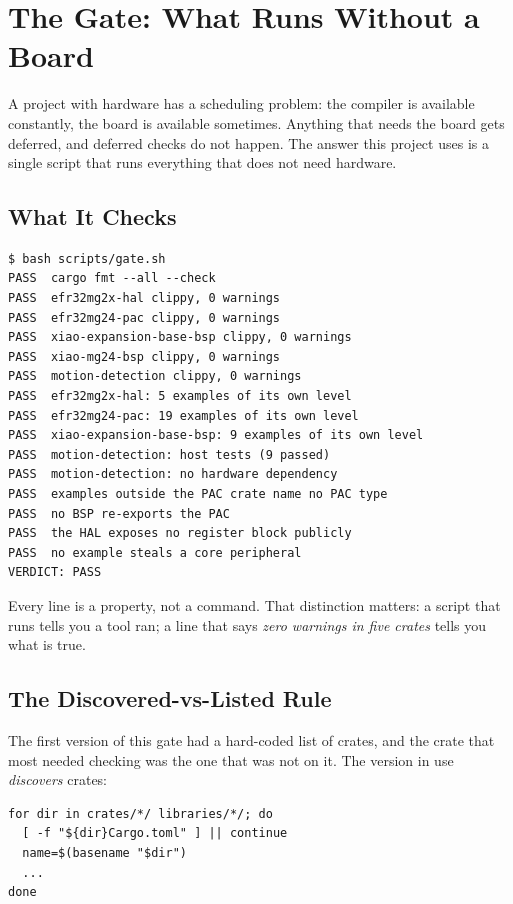 \section{The Gate: What Runs Without a Board}
\label{sec:build-gate}

A project with hardware has a scheduling problem: the compiler is available constantly, the board is
available sometimes. Anything that needs the board gets deferred, and deferred checks do not happen.
The answer this project uses is a single script that runs everything that does not need hardware.

\subsection{What It Checks}

\begin{verbatim}
$ bash scripts/gate.sh
PASS  cargo fmt --all --check
PASS  efr32mg2x-hal clippy, 0 warnings
PASS  efr32mg24-pac clippy, 0 warnings
PASS  xiao-expansion-base-bsp clippy, 0 warnings
PASS  xiao-mg24-bsp clippy, 0 warnings
PASS  motion-detection clippy, 0 warnings
PASS  efr32mg2x-hal: 5 examples of its own level
PASS  efr32mg24-pac: 19 examples of its own level
PASS  xiao-expansion-base-bsp: 9 examples of its own level
PASS  motion-detection: host tests (9 passed)
PASS  motion-detection: no hardware dependency
PASS  examples outside the PAC crate name no PAC type
PASS  no BSP re-exports the PAC
PASS  the HAL exposes no register block publicly
PASS  no example steals a core peripheral
VERDICT: PASS
\end{verbatim}

Every line is a property, not a command. That distinction matters: a script that runs
 tells you a tool ran; a line that says \emph{zero warnings in five crates}
tells you what is true.

\subsection{The Discovered-vs-Listed Rule}

The first version of this gate had a hard-coded list of crates, and the crate that most needed
checking was the one that was not on it. The version in use \emph{discovers} crates:

\begin{verbatim}
for dir in crates/*/ libraries/*/; do
  [ -f "${dir}Cargo.toml" ] || continue
  name=$(basename "$dir")
  ...
done
\end{verbatim}

